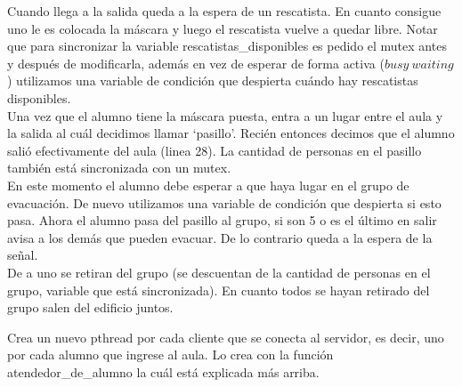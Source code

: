 Cuando llega a la salida queda a la espera de un rescatista. En cuanto consigue uno le es colocada la máscara y luego
el rescatista vuelve a quedar libre. Notar que para sincronizar la variable rescatistas\_disponibles 
es pedido el mutex antes y después de modificarla, además en vez de esperar de forma activa ($busy\ waiting$)
utilizamos una variable de condición que despierta cuándo hay rescatistas disponibles.\\

Una vez que el alumno tiene la máscara puesta, entra a un lugar entre el aula y la salida al cuál decidimos llamar 
\textquoteleft pasillo\textquoteright. Recién entonces decimos que el alumno salió efectivamente del aula (linea 28).
La cantidad de personas en el pasillo también está sincronizada con un mutex.\\

En este momento el alumno debe esperar a que haya lugar en el grupo de evacuación. De nuevo utilizamos una variable
de condición que despierta si esto pasa. Ahora el alumno pasa del pasillo al grupo, si son 5 o es el último en salir
avisa a los demás que pueden evacuar. De lo contrario queda a la espera de la señal.\\
De a uno se retiran del grupo (se descuentan de la cantidad de personas en el grupo, variable que está sincronizada).
En cuanto todos se hayan retirado del grupo salen del edificio juntos.
\bigskip

\begin{algorithmic}[1] 
     \EndIf
   \EndFor
 \EndFunction
\end{algorithmic}
\smallskip
Crea un nuevo pthread por cada cliente que se conecta al servidor, es decir, uno por cada alumno que ingrese al aula.
Lo crea con la función atendedor\_de\_alumno la cuál está explicada más arriba.